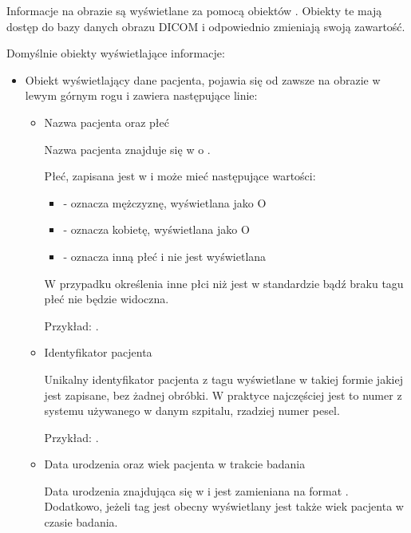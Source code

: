 Informacje na obrazie są wyświetlane za pomocą obiektów .
Obiekty te mają dostęp do bazy danych obrazu DICOM i odpowiednio zmieniają swoją zawartość.

Domyślnie obiekty wyświetlające informacje:
\begin{itemize}

    \item {}

    Obiekt wyświetlający dane pacjenta, pojawia się od zawsze na obrazie w lewym górnym rogu i zawiera następujące linie:
    \begin{itemize}
        \item Nazwa pacjenta oraz płeć

        Nazwa pacjenta znajduje się w  o .
        
        Płeć, zapisana jest w  i może mieć następujące wartości:
        \begin{itemize}
            \item {} - oznacza mężczyznę, wyświetlana jako O
            \item {} - oznacza kobietę, wyświetlana jako O
            \item {} - oznacza inną płeć i nie jest wyświetlana
        \end{itemize}
        
        W przypadku określenia inne płci niż jest w standardzie bądź braku tagu płeć nie będzie widoczna.

        Przykład: .

        \item Identyfikator pacjenta

        Unikalny identyfikator pacjenta z tagu  wyświetlane w takiej formie jakiej jest zapisane, bez żadnej obróbki.
        W praktyce najczęściej jest to numer z systemu używanego w danym szpitalu, rzadziej numer pesel.
        
        Przykład: .

        \item Data urodzenia oraz wiek pacjenta w trakcie badania

        Data urodzenia znajdująca się w  i jest zamieniana na format .
        Dodatkowo, jeżeli tag  jest obecny wyświetlany jest także wiek pacjenta w czasie badania.
    

\end{itemize}
\end{itemize}
